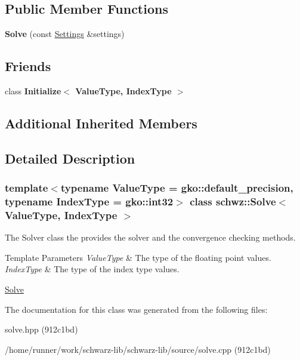 \subsection*{Public Member Functions}
\begin{DoxyCompactItemize}
\item 
\mbox{\label{classschwz_1_1Solve_a24250987949518cc92649066d3ce147d}} 
{\bfseries Solve} (const \hyperlink{structschwz_1_1Settings}{Settings} \&settings)
\end{DoxyCompactItemize}
\subsection*{Friends}
\begin{DoxyCompactItemize}
\item 
\mbox{\label{classschwz_1_1Solve_a7044b349fe5363eeace2d1a56b38f650}} 
class {\bfseries Initialize$<$ Value\+Type, Index\+Type $>$}
\end{DoxyCompactItemize}
\subsection*{Additional Inherited Members}


\subsection{Detailed Description}
\subsubsection*{template$<$typename Value\+Type = gko\+::default\+\_\+precision, typename Index\+Type = gko\+::int32$>$\newline
class schwz\+::\+Solve$<$ Value\+Type, Index\+Type $>$}

The Solver class the provides the solver and the convergence checking methods. 


\begin{DoxyTemplParams}{Template Parameters}
{\em Value\+Type} & The type of the floating point values. \\
\hline
{\em Index\+Type} & The type of the index type values.\\
\hline
\end{DoxyTemplParams}
\hyperlink{group__solve}{Solve} 

The documentation for this class was generated from the following files\+:\begin{DoxyCompactItemize}
\item 
solve.\+hpp (912c1bd)\item 
/home/runner/work/schwarz-\/lib/schwarz-\/lib/source/solve.\+cpp (912c1bd)\end{DoxyCompactItemize}

